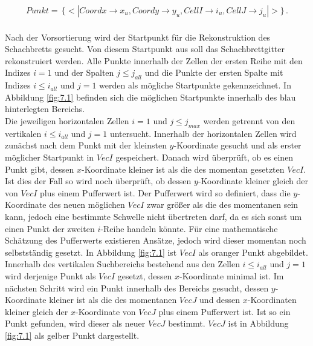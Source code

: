 \begin{gather*}
	Punkt = \, \{<|Coordx \rightarrow x_u, Coordy \rightarrow y_u, CellI \rightarrow i_u, CellJ \rightarrow j_u |>\} \, .
\end{gather*} \\


Nach der Vorsortierung wird der Startpunkt für die Rekonstruktion des Schachbretts gesucht. Von diesem Startpunkt aus soll das Schachbrettgitter rekonstruiert werden. Alle Punkte innerhalb der Zellen der ersten Reihe mit den Indizes $i = 1$ und der Spalten $j \leq  j_{all}$ und die Punkte der ersten Spalte mit Indizes $i \leq i_{all}$ und $j = 1$ werden als mögliche Startpunkte gekennzeichnet. In Abbildung \ref{fig:7.1} befinden sich die möglichen Startpunkte innerhalb des blau hinterlegten Bereichs.\\


Die jeweiligen horizontalen Zellen $i = 1$ und $j \leq  j_{max}$ werden getrennt von den vertikalen $i \leq i_{all}$ und $j = 1$ untersucht. Innerhalb der horizontalen Zellen wird zunächst nach dem Punkt mit der kleinsten $y$-Koordinate gesucht und als erster möglicher Startpunkt in $VecI$ gespeichert. Danach wird überprüft, ob es einen Punkt gibt, dessen $x$-Koordinate kleiner ist als die des momentan gesetzten $VecI$. Ist dies der Fall so wird noch überprüft, ob dessen $y$-Koordinate kleiner gleich der von $VecI$ plus einem Pufferwert ist. Der Pufferwert wird so definiert, dass die $y$-Koordinate des neuen möglichen $VecI$ zwar größer als die des momentanen sein kann, jedoch eine bestimmte Schwelle nicht übertreten darf, da es sich sonst um einen Punkt der zweiten $i$-Reihe handeln könnte. Für eine mathematische Schätzung des Pufferwerts existieren Ansätze, jedoch wird dieser momentan noch selbstständig gesetzt. In Abbildung \ref{fig:7.1} ist $VecI$ als oranger Punkt abgebildet.\\

Innerhalb des vertikalen Suchbereichs bestehend aus den Zellen  $i \leq i_{all}$ und $j = 1$ wird derjenige Punkt als $VecI$ gesetzt, dessen $x$-Koordinate minimal ist. Im nächsten Schritt wird ein Punkt innerhalb des Bereichs gesucht, dessen $y$-Koordinate kleiner ist als die des momentanen $VecJ$ und dessen $x$-Koordinaten kleiner gleich der $x$-Koordinate von $VecJ$ plus einem Pufferwert ist. Ist so ein Punkt gefunden, wird dieser als neuer $VecJ$ bestimmt. $VecJ$ ist in Abbildung \ref{fig:7.1} als gelber Punkt dargestellt.\\


